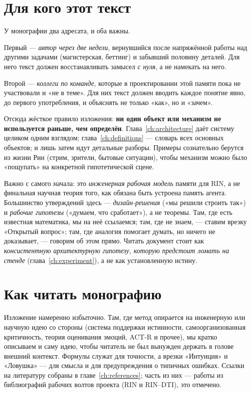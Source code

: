 \section{Для кого этот текст}

У монографии два адресата, и оба важны.

Первый — \emph{автор через две недели}, вернувшийся после напряжённой работы над
другими задачами (магистерская, беттинг) и забывший половину деталей. Для него
текст должен восстанавливать замысел \emph{с нуля}, а не намекать на него.

Второй — \emph{коллеги по команде}, которые в проектировании этой памяти пока не
участвовали и «не в теме». Для них текст должен вводить каждое понятие явно, до
первого употребления, и объяснять не только «как», но и «зачем».

Отсюда жёсткое правило изложения: \textbf{ни один объект или механизм не
используется раньше, чем определён}. Глава~\ref{ch:architecture} даёт систему
целиком одним взглядом; глава~\ref{ch:definitions} — словарь всех основных
объектов; и лишь затем идут детальные разборы. Примеры сознательно берутся из
жизни Рин (стрим, зрители, бытовые ситуации), чтобы механизм можно было «пощупать»
на конкретной гипотетической сцене.

\begin{intuition}
Важно с самого начала: это \emph{инженерная рабочая модель} памяти для RIN, а не
финальная научная теория того, как обязана быть устроена память агента. Большинство
утверждений здесь — \emph{дизайн-решения} («мы решили строить так») и \emph{рабочие
гипотезы} («думаем, что сработает»), а не теоремы. Там, где есть известная
математика, мы на неё ссылаемся; там, где не знаем, — ставим врезку «Открытый
вопрос»; там, где аналогия помогает думать, но ничего не доказывает, — говорим об
этом прямо. Читать документ стоит как \emph{консистентную архитектурную гипотезу,
которую предстоит ломать на стенде} (глава~\ref{ch:experiment}), а не как
установленную истину.
\end{intuition}

\section{Как читать монографию}

Изложение намеренно избыточно. Там, где метод опирается на инженерную или
научную идею со стороны (система поддержки истинности, самоорганизованная
критичность, теория оценивания эмоций, ACT-R и прочее), мы кратко описываем и
саму идею, чтобы читатель не был вынужден держать в голове внешний контекст.
Формулы служат для точности, а врезки «Интуиция» и «Ловушка» — для смысла и для
предупреждения о типичных ошибках. Ссылки на литературу собраны в
главе~\ref{ch:references}; часть из них — работы из библиографий рабочих волтов
проекта (RIN и RIN–DTI), это отмечено.
